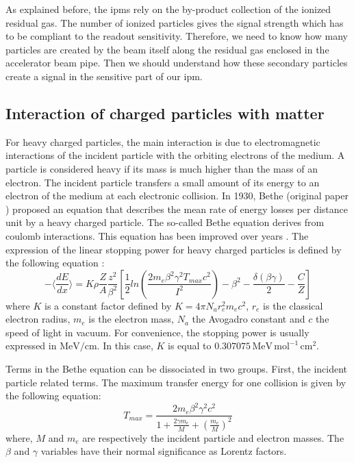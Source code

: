 \begin{refsection}
  As explained before, the \acrshort{ipm}s rely on the by-product collection of the ionized residual gas. The number of ionized particles gives the signal strength which has to be compliant to the readout sensitivity. Therefore, we need to know how many particles are created by the beam itself along the residual gas enclosed in the accelerator beam pipe. Then we should understand how these secondary particles create a signal in the sensitive part of our \acrshort{ipm}.


  \subsection{Interaction of charged particles with matter}
  For heavy charged particles, the main interaction is due to electromagnetic interactions of the incident particle with the orbiting electrons of the medium. A particle is considered heavy if its mass is much higher than the mass of an electron. The incident particle transfers a small amount of its energy to an electron of the medium at each electronic collision. In 1930, Bethe (original paper \cite{Bethe1930}) proposed an equation that describes the mean rate of energy losses per distance unit by a heavy charged particle. The so-called Bethe equation derives from coulomb interactions. This equation has been improved over years \cite{Fermi1940,Fano1963}. The expression of the linear stopping power for heavy charged particles is defined by the following equation \cite[p. 446]{Tanabashi2018}:
  \begin{equation}
    - \bigg \langle \frac{dE}{dx} \bigg \rangle =K \rho \frac{Z}{A} \frac{z^{2}}{\beta^{2}} \left[\frac{1}{2} ln \left(\frac{2 m_{e} \beta^{2} \gamma^{2} T_{max}c^{2}}{I^{2}} \right) - \beta^{2} - \frac{\delta(\beta \gamma)}{2} - \frac{C}{Z} \right]
  \end{equation}
  \noindent where \(K\) is a constant factor defined by \(K=4 \pi N_{a} r_{e}^{2} m_{e} c^{2}\), \(r_{e}\) is the classical electron radius, \(m_{e}\) is the electron mass, \(N_{a}\) the Avogadro constant and $c$ the speed of light in vacuum. For convenience, the stopping power is usually expressed in \(\mathrm{MeV/cm}\). In this case, \(K\) is equal to \(0.307075\,\mathrm{MeV \, mol^{-1} \, cm^{2}}\).

  Terms in the Bethe equation can be dissociated in two groups. First, the incident particle related terms. The maximum transfer energy for one collision is given by the following equation:
  \begin{equation}
    T_{max} = \frac{2 m_{e} \beta^{2} \gamma^{2} c^{2}}{1 + \frac{2 \gamma m_{e} }{M} + \left( \frac{m_{e}}{M} \right)^{2}}
  \end{equation}
  \noindent where, \(M\) and \(m_{e}\) are respectively the incident particle and electron masses. The \(\beta\) and \(\gamma\) variables have their normal significance as Lorentz factors.


\end{refsection}
